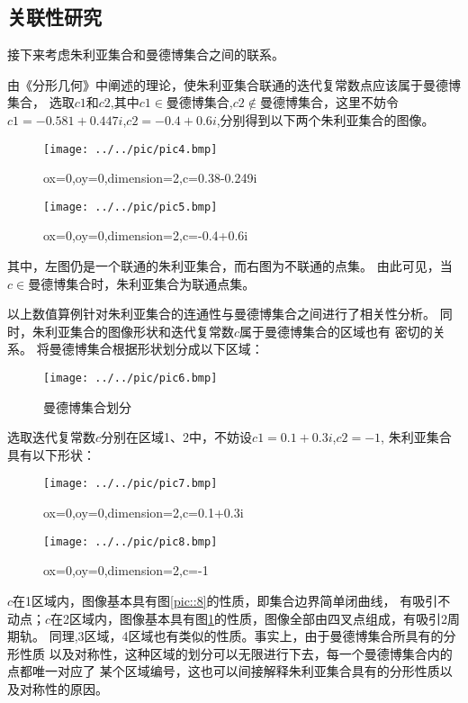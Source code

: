 \subsection{关联性研究}
接下来考虑朱利亚集合和曼德博集合之间的联系。
\par 
由《分形几何》\cite{1997Techniques}中阐述的理论，使朱利亚集合联通的迭代复常数点应该属于曼德博集合，
选取$c1$和$c2$,其中$c1 \in$曼德博集合,$c2 \notin$曼德博集合，这里不妨令
$c1=-0.581+0.447i$,$c2=-0.4+0.6i$,分别得到以下两个朱利亚集合的图像。
\begin{figure}[H]
    \begin{minipage}[t]{0.5\linewidth}
        \centering
        \texttt{[image: ../../pic/pic4.bmp]}
        \caption{ox=0,oy=0,dimension=2,c=0.38-0.249i}        
    \end{minipage}
    \begin{minipage}[t]{0.5\linewidth}
        \centering
        \texttt{[image: ../../pic/pic5.bmp]}
        \caption{ox=0,oy=0,dimension=2,c=-0.4+0.6i}        
    \end{minipage}   
\end{figure} 
\par 
其中，左图仍是一个联通的朱利亚集合，而右图为不联通的点集。
由此可见，当$c \in$曼德博集合时，朱利亚集合为联通点集。
\par 
以上数值算例针对朱利亚集合的连通性与曼德博集合之间进行了相关性分析。
同时，朱利亚集合的图像形状和迭代复常数$c$属于曼德博集合的区域也有
密切的关系。
将曼德博集合根据形状划分成以下区域：
\begin{figure}[H]
    \centering
    \texttt{[image: ../../pic/pic6.bmp]}
    \caption{曼德博集合划分}
\end{figure}
选取迭代复常数$c$分别在区域1、2中，不妨设$c1=0.1+0.3i$,$c2=-1$,
朱利亚集合具有以下形状：
\begin{figure}[H]
    \begin{minipage}[t]{0.5\linewidth}
        \centering
        \texttt{[image: ../../pic/pic7.bmp]}
        \caption{ox=0,oy=0,dimension=2,c=0.1+0.3i}
        \label{pic::8}        
    \end{minipage}
    \begin{minipage}[t]{0.5\linewidth}
        \centering
        \texttt{[image: ../../pic/pic8.bmp]}
        \caption{ox=0,oy=0,dimension=2,c=-1}   
        \label{pic::9}     
    \end{minipage}   
\end{figure}
\par 
$c$在1区域内，图像基本具有图\ref{pic::8}的性质，即集合边界简单闭曲线，
有吸引不动点；$c$在2区域内，图像基本具有图\ref{pic::9}的性质，图像全部由四叉点组成，有吸引2周期轨。
同理,3区域，4区域也有类似的性质。事实上，由于曼德博集合所具有的分形性质
以及对称性，这种区域的划分可以无限进行下去，每一个曼德博集合内的点都唯一对应了
某个区域编号，这也可以间接解释朱利亚集合具有的分形性质以及对称性的原因。

